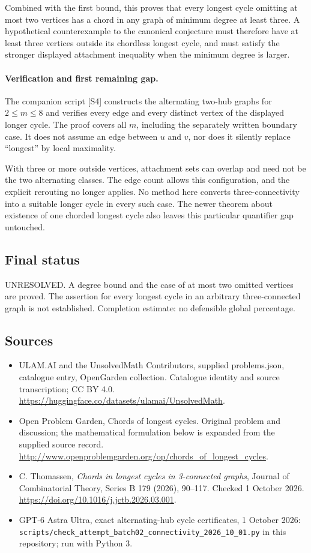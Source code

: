 \documentclass[11pt,a4paper]{article}
\begin{document}
Combined with the first bound, this proves that every longest cycle
omitting at most two vertices has a chord in any graph of minimum
degree at least three. A hypothetical counterexample to the canonical
conjecture must therefore have at least three vertices outside its
chordless longest cycle, and must satisfy the stronger displayed
attachment inequality when the minimum degree is larger.

\paragraph{Verification and first remaining gap.}
The companion script [S4] constructs the alternating two-hub graphs
for $2\le m\le8$ and verifies every edge and every distinct vertex
of the displayed longer cycle. The proof covers all $m$, including
the separately written boundary case. It does not assume an edge
between $u$ and $v$, nor does it silently replace ``longest'' by
local maximality.

With three or more outside vertices, attachment sets can overlap and
need not be the two alternating classes. The edge count allows this
configuration, and the explicit rerouting no longer applies. No method
here converts three-connectivity into a suitable longer cycle in every
such case. The newer theorem about existence of one chorded longest
cycle also leaves this particular quantifier gap untouched.

\subsection{Final status}
UNRESOLVED. A degree bound and the case of at most two omitted vertices
are proved. The assertion for every longest cycle in an arbitrary
three-connected graph is not established. Completion estimate: no
defensible global percentage.

\subsection{Sources}
\begin{itemize}
\item[S1] ULAM.AI and the UnsolvedMath Contributors, supplied problems.json, catalogue entry, OpenGarden collection. Catalogue identity and source transcription; CC BY 4.0.
\url{https://huggingface.co/datasets/ulamai/UnsolvedMath}.
\item[S2] Open Problem Garden, Chords of longest cycles. Original problem and discussion; the mathematical formulation below is expanded from the supplied source record.
\url{http://www.openproblemgarden.org/op/chords_of_longest_cycles}.
\item[S3] C. Thomassen, \emph{Chords in longest cycles in 3-connected graphs}, Journal of Combinatorial Theory, Series B 179 (2026), 90--117. Checked 1 October 2026.
\url{https://doi.org/10.1016/j.jctb.2026.03.001}.
\item[S4] GPT-6 Astra Ultra, exact alternating-hub cycle certificates, 1 October 2026: \texttt{scripts/check\_attempt\_batch02\_connectivity\_2026\_10\_01.py} in this repository; run with Python 3.
\end{itemize}
\end{document}
